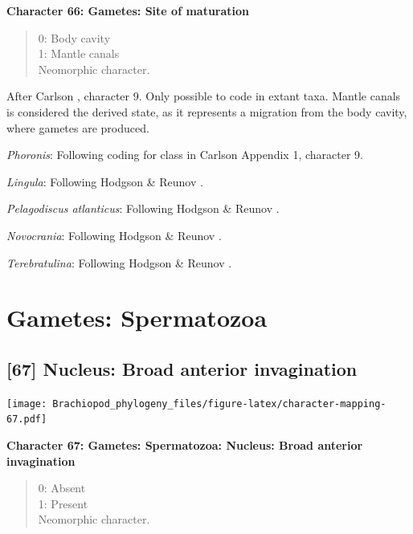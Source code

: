 \documentclass[openany]{book}
\theoremstyle{definition}
\theoremstyle{definition}
\theoremstyle{definition}
\theoremstyle{remark}
\begin{document}
\textbf{Character 66: Gametes: Site of maturation}

\begin{quote}
0: Body cavity\\
1: Mantle canals\\
Neomorphic character.
\end{quote}

After Carlson \citeyearpar{Carlson1995Phylogeneticrelationships},
character 9. Only possible to code in extant taxa. Mantle canals is
considered the derived state, as it represents a migration from the body
cavity, where gametes are produced.

\emph{Phoronis}: Following coding for class in Carlson
\citeyearpar{Carlson1995Phylogeneticrelationships} Appendix 1, character
9.

\emph{Lingula}: Following Hodgson \& Reunov
\citeyearpar{Hodgson1994Ultrastructureof}.

\emph{Pelagodiscus atlanticus}: Following Hodgson \& Reunov
\citeyearpar{Hodgson1994Ultrastructureof}.

\emph{Novocrania}: Following Hodgson \& Reunov
\citeyearpar{Hodgson1994Ultrastructureof}.

\emph{Terebratulina}: Following Hodgson \& Reunov
\citeyearpar{Hodgson1994Ultrastructureof}.

\hypertarget{gametes-spermatozoa}{%
\section{Gametes: Spermatozoa}\label{gametes-spermatozoa}}

\hypertarget{nucleus-broad-anterior-invagination}{%
\subsection*{{[}67{]} Nucleus: Broad anterior
invagination}\label{nucleus-broad-anterior-invagination}}

\texttt{[image: Brachiopod\_phylogeny\_files/figure-latex/character-mapping-67.pdf]}

\textbf{Character 67: Gametes: Spermatozoa: Nucleus: Broad anterior
invagination}

\begin{quote}
0: Absent\\
1: Present\\
Neomorphic character.
\end{quote}
\end{document}
